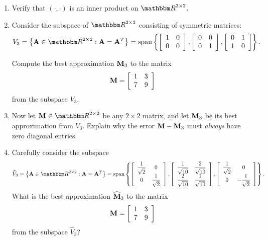 \begin{enumerate}
\item Verify that $(\cdot, \cdot)$ is an inner product on $\R^{2\times 2}$.

\item Consider the subspace of $\R^{2\times 2}$ consisting of symmetric matrices:
      \[  V_3 =\left\{\BA\in \R^{2\times2}:\BA=\BA^T\right\}= {\rm span}\left\{ 
       \left[\begin{array}{cc}1 & 0 \\ 0 & 0\end{array}\right], 
       \left[\begin{array}{cc}0 & 0 \\ 0 & 1\end{array}\right], 
       \left[\begin{array}{cc}0 & 1 \\ 1 & 0\end{array}\right]\right\}.\]
      
      Compute the best approximation ${\bf M}_3$ to the matrix
      \[ {\bf M} = \left[\begin{array}{cc}1 & 3 \\ 7 & 9\end{array}\right]\]
      from the subspace $V_3$.

\item Now let $\BM\in\R^{2\times2}$ be any $2\times 2$ matrix, and let
           ${\bf M}_3$ be its best approximation from $V_3$.
           Explain why the error ${\bf M}-{\bf M}_3$ must \emph{always} have zero 
           diagonal entries.

\item Carefully consider the subspace
      \[  \widehat{V}_3 =\left\{\BA\in \R^{2\times2}:\BA=\BA^T\right\}= {\rm span}\left\{ 
       \left[\begin{array}{cc}\displaystyle{{1\over\sqrt{2}}}  & 0 \\ 0 & \displaystyle{{1\over \sqrt{2}}}\end{array}\right], 
       \left[\begin{array}{cc}\displaystyle{{1\over\sqrt{10}}} & \displaystyle{{2\over\sqrt{10}}} \\ \displaystyle{{2\over\sqrt{10}}} & \displaystyle{{1\over \sqrt{10}}}\end{array}\right], 
       \left[\begin{array}{cc}\displaystyle{{1\over\sqrt{2}}} & 0 \\ 0 & \displaystyle{-{1\over\sqrt{2}}}\end{array}\right]\right\}.\]
       What is the best approximation $\widehat{{\bf M}}_3$  to the matrix
      \[ {\bf M} = \left[\begin{array}{cc}1 & 3 \\ 7 & 9\end{array}\right]\]
      from the subspace $\widehat{V}_3$?

\end{enumerate}



